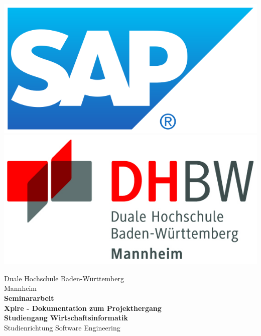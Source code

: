 \begin{titlepage}
\begin{minipage}{\textwidth}
		\vspace{-2cm}
		\noindent \includegraphics[scale=0.14]{img/sap.png} \hfill   \includegraphics{img/logo.jpg}
\end{minipage}
\vspace{1em}
\sffamily
\begin{center}
	\textsf{\large{}Duale Hochschule Baden-W\"urttemberg\\[1.5mm] Mannheim}\\[2em]
	\textsf{\textbf{\Large{}Seminararbeit}}\\[3mm]
	\textsf{\textbf{Xpire - Dokumentation zum Projekthergang}} \\[1.5cm]
	\textsf{\textbf{\Large{}Studiengang Wirtschaftsinformatik}\\[3mm] \textsf{Studienrichtung Software Engineering}}
	
	\vspace{3em}
\vfill

\begin{minipage}{\textwidth}


\end{minipage}
\end{center}
\end{titlepage}
